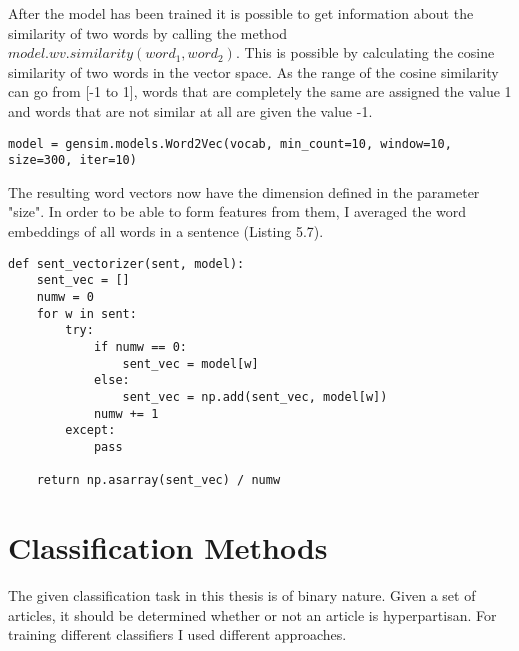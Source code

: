 \documentclass[a4paper, 11pt,titlepage,oneside,openany]{book}
\begin{document}
\indent 
After the model has been trained it is possible to get information about the similarity of two words by calling the method $model.wv.similarity(word_1, word_2)$. This is possible by calculating the cosine similarity of two words in the vector space. As the range of the cosine similarity can go from [-1 to 1], words that are completely the same are assigned the value 1 and words that are not similar at all are given the value -1. 
 \begin{lstlisting}[caption=Word2Vec with gensim]
model = gensim.models.Word2Vec(vocab, min_count=10, window=10, size=300, iter=10)
\end{lstlisting}
\newpage
\indent The resulting word vectors now have the dimension defined in the parameter "size". In order to be able to form features from them, I averaged the word embeddings of all words in a sentence (Listing 5.7).
\begin{lstlisting}[caption=sent\_vectorizer]
def sent_vectorizer(sent, model):
    sent_vec = []
    numw = 0
    for w in sent:
        try:
            if numw == 0:
                sent_vec = model[w]
            else:
                sent_vec = np.add(sent_vec, model[w])
            numw += 1
        except:
            pass

    return np.asarray(sent_vec) / numw
\end{lstlisting}

\section{Classification Methods}
The given classification task in this thesis is of binary nature. Given a set of articles, it should be determined whether or not an article is hyperpartisan. For training different classifiers I used different approaches. \\
\end{document}
